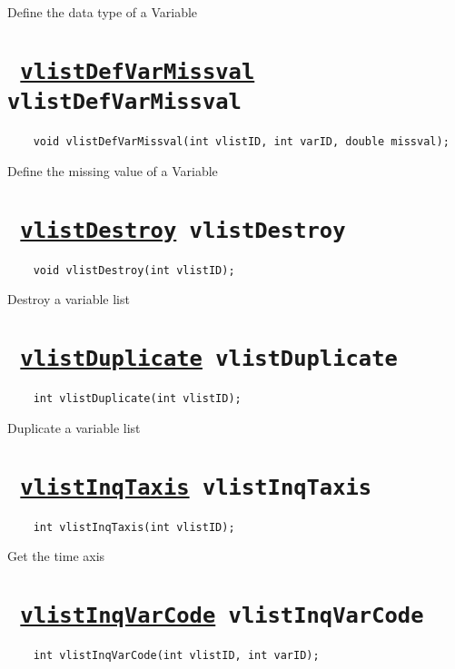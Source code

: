 Define the data type of a Variable
\ifpdfoutput{}{(\ref{vlistDefVarDatatype})}


\section*{\texttt{ 
\ifpdf
\hyperref[vlistDefVarMissval]{vlistDefVarMissval}
\else
vlistDefVarMissval
\fi
}}
\begin{verbatim}
    void vlistDefVarMissval(int vlistID, int varID, double missval);
\end{verbatim}

Define the missing value of a Variable
\ifpdfoutput{}{(\ref{vlistDefVarMissval})}


\section*{\texttt{ 
\ifpdf
\hyperref[vlistDestroy]{vlistDestroy}
\else
vlistDestroy
\fi
}}
\begin{verbatim}
    void vlistDestroy(int vlistID);
\end{verbatim}

Destroy a variable list
\ifpdfoutput{}{(\ref{vlistDestroy})}


\section*{\texttt{ 
\ifpdf
\hyperref[vlistDuplicate]{vlistDuplicate}
\else
vlistDuplicate
\fi
}}
\begin{verbatim}
    int vlistDuplicate(int vlistID);
\end{verbatim}

Duplicate a variable list
\ifpdfoutput{}{(\ref{vlistDuplicate})}


\section*{\texttt{ 
\ifpdf
\hyperref[vlistInqTaxis]{vlistInqTaxis}
\else
vlistInqTaxis
\fi
}}
\begin{verbatim}
    int vlistInqTaxis(int vlistID);
\end{verbatim}

Get the time axis
\ifpdfoutput{}{(\ref{vlistInqTaxis})}


\section*{\texttt{ 
\ifpdf
\hyperref[vlistInqVarCode]{vlistInqVarCode}
\else
vlistInqVarCode
\fi
}}
\begin{verbatim}
    int vlistInqVarCode(int vlistID, int varID);
\end{verbatim}

